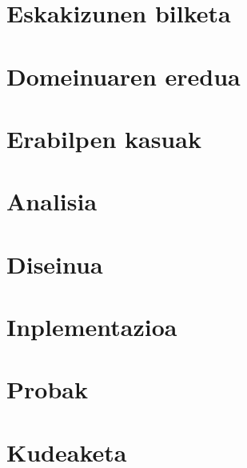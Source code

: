 
\section{Eskakizunen bilketa}

\section{Domeinuaren eredua}

\section{Erabilpen kasuak}

\section{Analisia}

\section{Diseinua}

\section{Inplementazioa}

\section{Probak}

\section{Kudeaketa}